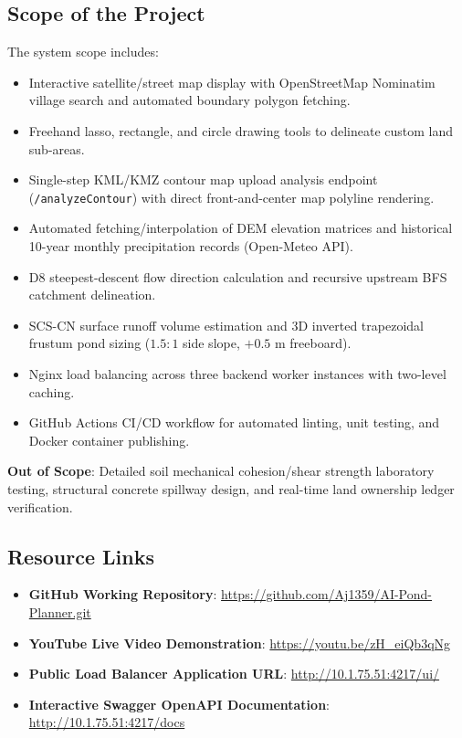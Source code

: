 \documentclass[manuscript,screen]{acmart}
\begin{document}
\subsection{Scope of the Project}
The system scope includes:
\begin{itemize}[leftmargin=*]
    \item Interactive satellite/street map display with OpenStreetMap Nominatim village search and automated boundary polygon fetching.
    \item Freehand lasso, rectangle, and circle drawing tools to delineate custom land sub-areas.
    \item Single-step KML/KMZ contour map upload analysis endpoint (\texttt{/analyzeContour}) with direct front-and-center map polyline rendering.
    \item Automated fetching/interpolation of DEM elevation matrices and historical 10-year monthly precipitation records (Open-Meteo API).
    \item D8 steepest-descent flow direction calculation and recursive upstream BFS catchment delineation.
    \item SCS-CN surface runoff volume estimation and 3D inverted trapezoidal frustum pond sizing ($1.5:1$ side slope, $+0.5\text{ m}$ freeboard).
    \item Nginx load balancing across three backend worker instances with two-level caching.
    \item GitHub Actions CI/CD workflow for automated linting, unit testing, and Docker container publishing.
\end{itemize}
\textbf{Out of Scope}: Detailed soil mechanical cohesion/shear strength laboratory testing, structural concrete spillway design, and real-time land ownership ledger verification.

\subsection{Resource Links}
\begin{itemize}[leftmargin=*]
    \item \textbf{GitHub Working Repository}: \url{https://github.com/Aj1359/AI-Pond-Planner.git}
    \item \textbf{YouTube Live Video Demonstration}: \url{https://youtu.be/zH_eiQb3qNg}
    \item \textbf{Public Load Balancer Application URL}: \url{http://10.1.75.51:4217/ui/}
    \item \textbf{Interactive Swagger OpenAPI Documentation}: \url{http://10.1.75.51:4217/docs}
\end{itemize}
\end{document}
